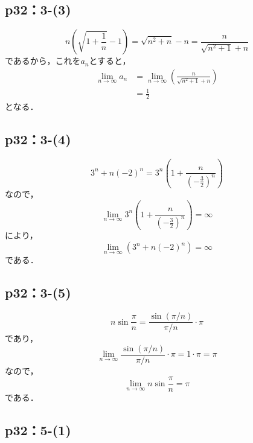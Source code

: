 \documentclass[uplatex,dvipdfmx,a4paper,10pt,fleqn]{jsarticle}
\newenvironment{tleftbar}{\begin{tbleftline}\setlength{\parindent}{1zw}}{\end{tbleftline}}
\begin{document}
\subsection*{p32：3-(3)}

\begin{tleftbar}
    \[
        n \left ( \sqrt{1+\frac{1}{n}}-1 \right) = \sqrt{n^2+n}-n = \frac{n}{\sqrt{n^2+1}+n}
    \]
    であるから，これを$a_n$とすると，
    \begin{align*}
        \lim_{n \to \infty} a_n & =\lim_{n \to \infty}  \left ( \frac{n}{\sqrt{n^2+1}+n} \right) \\
        & = \frac{1}{2}
    \end{align*}
    となる．
\end{tleftbar}

\subsection*{p32：3-(4)}

\begin{tleftbar}
\[
    3^n +n(-2)^n = 3^n \left (1+ \frac{n}{ \left (-\frac{3}{2} \right)^n } \right)
\]
なので，
\[
    \lim_{n \to \infty}  3^n \left (1+ \frac{n}{ \left (-\frac{3}{2} \right)^n } \right) =\infty
\]
により，
\[
    \lim_{n \to \infty} (3^n +n(-2)^n)=\infty 
\]
である．
\end{tleftbar}



\subsection*{p32：3-(5)}

\begin{tleftbar}
    \[
        n \sin \frac{\pi}{n} = \frac{\sin (\pi/n)}{\pi/n} \cdot \pi　
    \]
    であり，
    \[
        \lim_{n \to \infty} \frac{\sin (\pi/n)}{\pi/n} \cdot \pi　= 1 \cdot \pi =\pi
    \]
    なので，
    \[
        \lim_{n \to \infty} n \sin \frac{\pi}{n} = \pi
    \]
    である．
\end{tleftbar}




\subsection*{p32：5-(1)}
\end{document}
